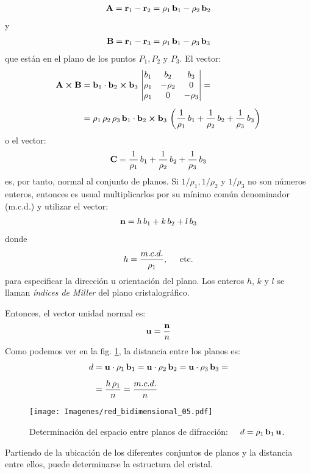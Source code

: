 \begin{align*}
    \vb{A} = \vb{r}_{1} - \vb{r}_{2} = \rho_{1} \, \vb{b}_{1} - \rho_{2} \, \vb{b}_{2}
\end{align*}
y
\begin{align*}
    \vb{B} = \vb{r}_{1} - \vb{r}_{3} = \rho_{1} \, \vb{b}_{1} - \rho_{3} \, \vb{b}_{3}
\end{align*}
que están en el plano de los puntos $P_{1}, P_{2}$ y $P_{3}$. El vector:
\begin{align*}
    \vb{A} \cp \vb{B} &= \vb{b}_{1} \cdot \vb{b}_{2} \cp \vb{b}_{3} \, \mdet{
        b_{1} & b_{2} & b_{3} \\
        \rho_{1} & -\rho_{2} & 0 \\
        \rho_{1} & 0 & -\rho_{3}
    } = \\[0.5em]
    &= \rho_{1} \, \rho_{2} \, \rho_{3} \, \vb{b}_{1} \cdot \vb{b}_{2} \cp \vb{b}_{3} \, \left( \dfrac{1}{\rho_{1}} \, b_{1} + \dfrac{1}{\rho_{2}} \, b_{2} + \dfrac{1}{\rho_{3}} \, b_{3} \right)
\end{align*}
o el vector:
\begin{align*}
    \vb{C} = \dfrac{1}{\rho_{1}} \, b_{1} + \dfrac{1}{\rho_{2}} \, b_{2} + \dfrac{1}{\rho_{3}} \, b_{3}
\end{align*}
es, por tanto, normal al conjunto de planos. Si $1/\rho_{1}, 1/\rho_{2}$ y $1/\rho_{3}$ no son números enteros, entonces es usual multiplicarlos por su mínimo común denominador (m.c.d.) y utilizar el vector:
\begin{align*}
    \vb{n} = h \, b_{1} + k \, b_{2} + l \, b_{3}
\end{align*}
donde
\begin{align*}
    h = \dfrac{m.c.d.}{\rho_{1}}, \hspace{0.5cm} \text{etc.}
\end{align*}
para especificar la dirección u orientación del plano. Los enteros $h$, $k$ y $l$ se llaman \emph{índices de Miller} del plano cristalográfico.
\par
Entonces, el vector unidad normal es:
\begin{align*}
    \vb{u} = \dfrac{\vb{n}}{n}
\end{align*}
Como podemos ver en la fig. \ref{fig:figura_01_18}, la distancia entre los planos es:
\begin{align*}
d &= \vb{u} \cdot \rho_{1} \, \vb{b}_{1} = \vb{u} \cdot \rho_{2} \, \vb{b}_{2} = \vb{u} \cdot \rho_{3} \, \vb{b}_{3} = \\[0.5em]
&= \dfrac{h \, \rho_{1}}{n} = \dfrac{m.c.d.}{n}
\end{align*}
\begin{figure}[H]
    \centering
    \texttt{[image: Imagenes/red\_bidimensional\_05.pdf]}
    \caption{Determinación del espacio entre planos de difracción: \, \, $d = \rho_{1} \, \vb{b}_{1} \, \vb{u}$.}
    \label{fig:figura_01_18}
\end{figure}
Partiendo de la ubicación de los diferentes conjuntos de planos y la distancia entre ellos, puede determinarse la estructura del cristal.

